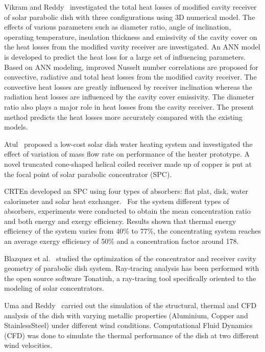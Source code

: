 Vikram and Reddy~\cite{Vikram2015} investigated the total heat losses of modified cavity receiver of solar parabolic dish with three configurations using 3D numerical model. The effects of various parameters such as diameter ratio, angle of inclination, operating temperature, insulation thickness and emissivity of the cavity cover on the heat losses from the modified vavity receiver are investigated. An ANN model is developed to predict the heat loss for a large set of influencing parameters. Based on ANN modeling, improved Nusselt number correlations are proposed for convective, radiative and total heat losses from the modified cavity receiver. The convective heat losses are greatly influenced by receiver inclination whereas the radiation heat losses are influenced by the cavity cover emissivity. The diameter ratio also plays a major role in heat losses from the cavity receiver. The present method predicts the heat losses more accurately compared with the existing models.

Atul~\cite{Atul2015} proposed a low-cost solar dish water heating system and investigated the effect of variation of mass flow rate on performance of the heater prototype. A novel truncated cone-shaped helical coiled receiver made up of copper is put at the focal point of solar parabolic concentrator (SPC).

CRTEn developed an SPC using four types of absorbers: flat plat, disk, water calorimeter and solar heat exchanger.~\cite{Skouri2013} For the system different types of absorbers, experiments were conducted to obtain the mean concentration ratio and both energy and exergy efficiency. Results shown that thermal energy efficiency of the system varies from 40\% to 77\%, the concentrating system reaches an average exergy efficiency of 50\% and a concentration factor around 178.

Blazquez et al.~\cite{Blazquez2016} studied the optimization of the concentrator and receiver cavity geometry of parabolic dish system. Ray-tracing analysis has been performed with the open source software Tonatiuh, a ray-tracing tool specifically oriented to the modeling of solar concentrators.

Uma and Reddy~\cite{Uma2015} carried out the simulation of the structural, thermal and CFD analysis of the dish with varying metallic properties (Aluminium, Copper and StainlessSteel) under different wind conditions. Computational Fluid Dynamics (CFD) was done to simulate the thermal performance of the dish at two different wind velocities.

